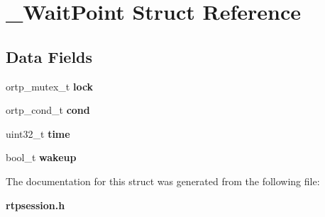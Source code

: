 \section{\+\_\+\+Wait\+Point Struct Reference}
\label{struct__WaitPoint}
\subsection*{Data Fields}
\begin{DoxyCompactItemize}
\item 
\mbox{\label{struct__WaitPoint_a2ab46fa59a2c2e25b77ea6960b0d68f5}} 
ortp\+\_\+mutex\+\_\+t {\bfseries lock}
\item 
\mbox{\label{struct__WaitPoint_a2755da7b7121e8ed270de3a4b7bbf407}} 
ortp\+\_\+cond\+\_\+t {\bfseries cond}
\item 
\mbox{\label{struct__WaitPoint_a4549ce50ff706465812adb9ab8a2e6b8}} 
uint32\+\_\+t {\bfseries time}
\item 
\mbox{\label{struct__WaitPoint_a130ec3e375dd88a309eca7561f466472}} 
bool\+\_\+t {\bfseries wakeup}
\end{DoxyCompactItemize}


The documentation for this struct was generated from the following file\+:\begin{DoxyCompactItemize}
\item 
\textbf{ rtpsession.\+h}\end{DoxyCompactItemize}
